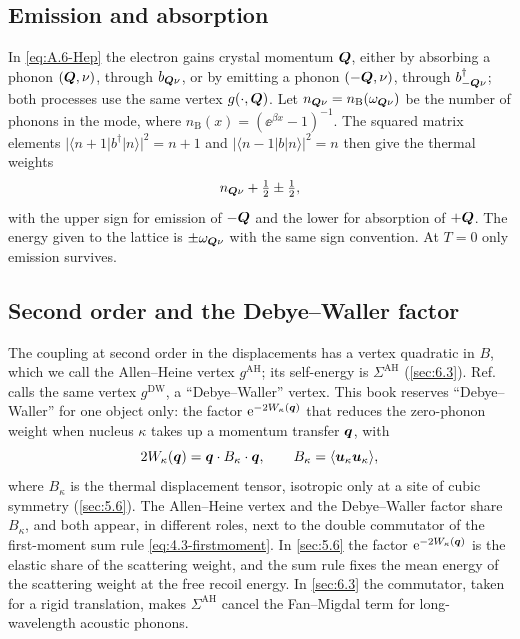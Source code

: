 \subsection{Emission and absorption}

In \cref{eq:A.6-Hep} the electron gains crystal momentum $\bm{Q}$, either by absorbing a phonon $(\bm{Q},\nu)$, through $b_{\bm{Q}\nu}$, or by emitting a phonon $(-\bm{Q},\nu)$, through $b^\dagger_{-\bm{Q}\nu}$; both processes use the same vertex $g(\cdot,\bm{Q})$. Let $n_{\bm{Q}\nu} = n_{\mathrm{B}}(\omega_{\bm{Q}\nu})$ be the number of phonons in the mode, where $n_{\mathrm{B}}(x) = (\ee^{\beta x} - 1)^{-1}$. The squared matrix elements $|\langle n+1|b^\dagger|n\rangle|^2 = n+1$ and $|\langle n-1|b|n\rangle|^2 = n$ then give the thermal weights
\begin{equation}
  n_{\bm{Q}\nu} + \tfrac12 \pm \tfrac12 ,
  \label{eq:A.6-weights}
\end{equation}
with the upper sign for emission of $-\bm{Q}$ and the lower for absorption of $+\bm{Q}$. The energy given to the lattice is $\pm\omega_{\bm{Q}\nu}$ with the same sign convention. At $T = 0$ only emission survives.

\subsection{Second order and the Debye--Waller factor}

The coupling at second order in the displacements has a vertex quadratic in $B$, which we call the Allen--Heine vertex $g^{\mathrm{AH}}$; its self-energy is $\Sigma^{\mathrm{AH}}$ (\cref{sec:6.3}). Ref.~\cite[Eqs.~(39) and (40)]{giustino2017electron} calls the same vertex $g^{\mathrm{DW}}$, a ``Debye--Waller'' vertex. This book reserves ``Debye--Waller'' for one object only: the factor $\mathrm{e}^{-2W_\kappa(\bm{q})}$ that reduces the zero-phonon weight when nucleus $\kappa$ takes up a momentum transfer $\bm{q}$, with
\begin{equation}
  2W_\kappa(\bm{q}) = \bm{q}\cdot B_\kappa\cdot\bm{q}, \qquad B_\kappa = \langle\bm{u}_\kappa\bm{u}_\kappa\rangle,
  \label{eq:A.6-DW}
\end{equation}
where $B_\kappa$ is the thermal displacement tensor, isotropic only at a site of cubic symmetry (\cref{sec:5.6}). The Allen--Heine vertex and the Debye--Waller factor share $B_\kappa$, and both appear, in different roles, next to the double commutator of the first-moment sum rule \cref{eq:4.3-firstmoment}. In \cref{sec:5.6} the factor $\mathrm{e}^{-2W_\kappa(\bm{q})}$ is the elastic share of the scattering weight, and the sum rule fixes the mean energy of the scattering weight at the free recoil energy. In \cref{sec:6.3} the commutator, taken for a rigid translation, makes $\Sigma^{\mathrm{AH}}$ cancel the Fan--Migdal term for long-wavelength acoustic phonons.
